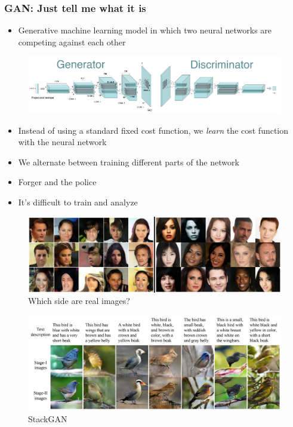 \documentclass{Bredelebeamer}
\begin{document}

\begin{frame}
	\frametitle{GAN: Just tell me what it is}
	\begin{itemize}
		\item Generative machine learning model in which two neural networks are competing against each other
	\end{itemize}
\begin{figure}[h!]
	\centering
	\includegraphics[width=\textwidth]{dcgan_both.png}
\end{figure}
	\pause
	\begin{itemize}[<+->]
		\item Instead of using a standard fixed cost function, we \textit{learn} the cost function with the neural network
		\item We alternate between training different parts of the network
		\item Forger and the police
		\item It's difficult to train and analyze
	\end{itemize}
\end{frame}

\begin{frame}
\begin{figure}[h!]
	\centering
	\includegraphics[width=\textwidth]{which_is_real.png}
	\caption{Which side are real images?}
	\label{fig:which_is_real}
\end{figure}
\end{frame}


\begin{frame}
\begin{figure}[h!]
	\centering
	\includegraphics[width=\textwidth]{stack_gan.jpg}
	\caption{StackGAN}
\end{figure}
\end{frame}
\end{document}
